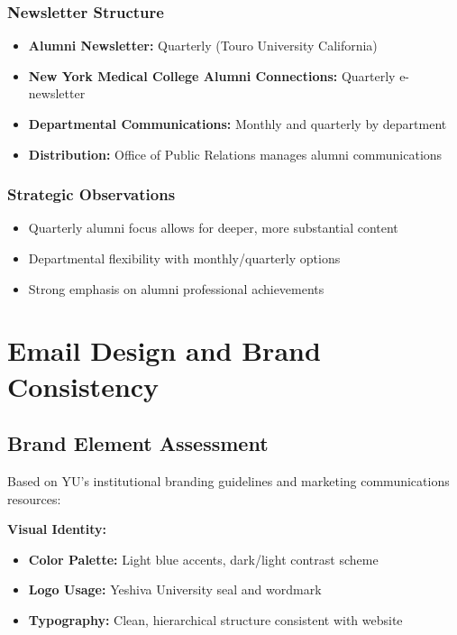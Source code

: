 \documentclass[12pt,letterpaper]{article}
\begin{document}
\subsubsection{Newsletter Structure}
\begin{itemize}[leftmargin=*]
    \item \textbf{Alumni Newsletter:} Quarterly (Touro University California)
    \item \textbf{New York Medical College Alumni Connections:} Quarterly e-newsletter
    \item \textbf{Departmental Communications:} Monthly and quarterly by department
    \item \textbf{Distribution:} Office of Public Relations manages alumni communications
\end{itemize}

\subsubsection{Strategic Observations}
\begin{itemize}[leftmargin=*]
    \item Quarterly alumni focus allows for deeper, more substantial content
    \item Departmental flexibility with monthly/quarterly options
    \item Strong emphasis on alumni professional achievements
\end{itemize}

\section{Email Design and Brand Consistency}

\subsection{Brand Element Assessment}

Based on YU's institutional branding guidelines and marketing communications resources:

\textbf{Visual Identity:}
\begin{itemize}[leftmargin=*]
    \item \textbf{Color Palette:} Light blue accents, dark/light contrast scheme
    \item \textbf{Logo Usage:} Yeshiva University seal and wordmark
    \item \textbf{Typography:} Clean, hierarchical structure consistent with website
\end{itemize}
\end{document}
